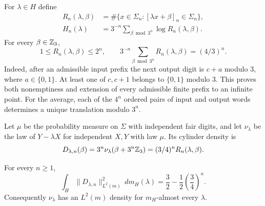 For $\lambda\in H$ define
\begin{equation}\label{typical:affine-count}
 \begin{split}
 R_n(\lambda,\beta)
   &=\#\{x\in\Sigma_n:[\lambda x+\beta]_n\in\Sigma_n\},\\
 H_n(\lambda)&=3^{-n}\sum_{\beta\bmod3^n}\log R_n(\lambda,\beta).
 \end{split}
\end{equation}
For every $\beta\in\mathbb Z_3$,
\begin{equation}\label{typical:count-range}
 1\le R_n(\lambda,\beta)\le2^n,
 \qquad
 3^{-n}\sum_{\beta\bmod3^n}R_n(\lambda,\beta)=(4/3)^n.
\end{equation}
Indeed, after an admissible input prefix the next output digit is
$c+a$ modulo $3$, where $a\in\{0,1\}$. At least one of $c,c+1$
belongs to $\{0,1\}$ modulo $3$. This proves both nonemptiness and
extension of every admissible finite prefix to an infinite point.
For the average, each of the $4^n$ ordered pairs of input and output
words determines a unique translation modulo $3^n$.

Let $\mu$ be the probability measure on $\Sigma$ with independent
fair digits, and let $\nu_\lambda$ be the law of $Y-\lambda X$ for
independent $X,Y$ with law $\mu$. Its cylinder density is
\begin{equation}\label{typical:cylinder-density}
 D_{\lambda,n}(\beta)
 =3^n\nu_\lambda(\beta+3^n\mathbb Z_3)
 =(3/4)^nR_n(\lambda,\beta).
\end{equation}

\begin{lemma}\label{typical:l2}
For every $n\ge1$,
\begin{equation}\label{typical:l2-identity}
 \int_H\|D_{\lambda,n}\|_{L^2(m)}^2\,dm_H(\lambda)
       =\frac32-\frac12\left(\frac34\right)^n.
\end{equation}
Consequently $\nu_\lambda$ has an $L^2(m)$ density for
$m_H$-almost every $\lambda$.
\end{lemma}

